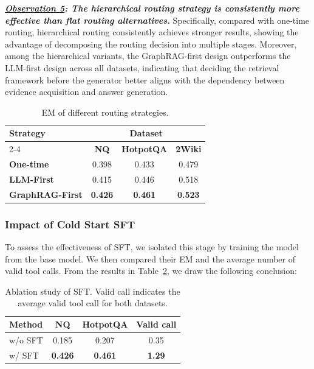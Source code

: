 \textit{\textbf{\underline{Observation 5}: The hierarchical routing strategy is consistently more effective than flat routing alternatives.}} Specifically, compared with one-time routing, hierarchical routing consistently achieves stronger results, showing the advantage of decomposing the routing decision into multiple stages. Moreover, among the hierarchical variants, the GraphRAG-first design outperforms the LLM-first design across all datasets, indicating that deciding the retrieval framework before the generator better aligns with the dependency between evidence acquisition and answer generation.

\begin{table}[]
\centering
\footnotesize
\setlength{\tabcolsep}{5pt}
\renewcommand{\arraystretch}{1.3}
\begin{tabular}{lccc}
\toprule
\multirow{2}{*}{\textbf{Strategy}} & \multicolumn{3}{c}{\textbf{Dataset}} \\ \cline{2-4}
                                   & \textbf{NQ} & \textbf{HotpotQA} & \textbf{2Wiki} \\ 
\midrule
\textbf{One-time}                  & 0.398       & 0.433             & 0.479          \\
\textbf{LLM-First}                 & 0.415       & 0.446             & 0.518          \\
\textbf{GraphRAG-First}            & \textbf{0.426} & \textbf{0.461} & \textbf{0.523} \\
\bottomrule
\end{tabular}
\caption{EM of different routing strategies.}
\vspace{-5pt}
\label{tab:routing}
\end{table}
\subsubsection{Impact of Cold Start SFT}
To assess the effectiveness of SFT, we isolated this stage by training the model from the base model. We then compared their EM and the average number of valid tool calls. From the results in Table~\ref{tab:SFT}, we draw the following conclusion:
\begin{table}[]
\centering
\footnotesize
\setlength{\tabcolsep}{5pt}
\renewcommand{\arraystretch}{1.1}
\begin{tabular}{l|ccc}
\toprule
\textbf{Method} & \textbf{NQ} & \textbf{HotpotQA} & \textbf{Valid call} \\ 
\midrule
w/o SFT         & 0.185       & 0.207         & 0.35                     \\
w/ SFT          & \textbf{0.426} & \textbf{0.461} & \textbf{1.29}         \\
\bottomrule
\end{tabular}
\caption{Ablation study of SFT. Valid call indicates the average valid tool call for both datasets.}
\label{tab:SFT}
\vspace{-10pt}
\end{table}

